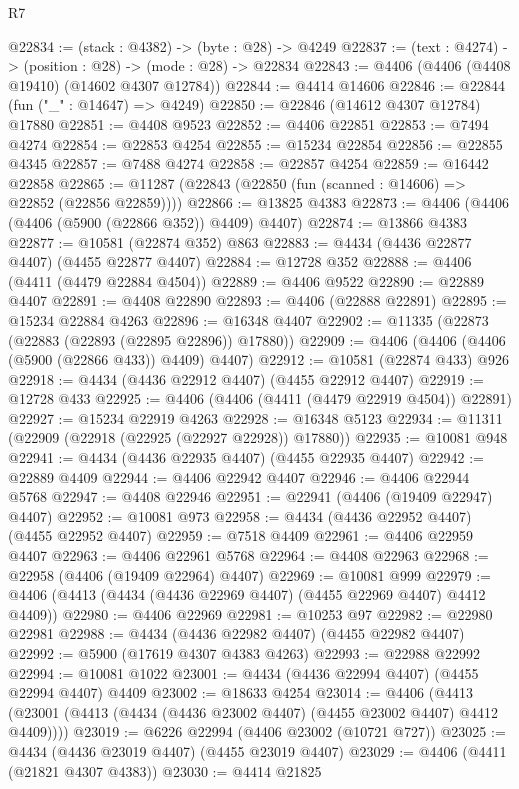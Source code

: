 \begin{lexlean}{R7}
\begin{coremodule}
@22834 := (stack : @4382) -> (byte : @28) -> @4249
@22837 := (text : @4274) -> (position : @28) -> (mode : @28) -> @22834
@22843 := @4406 (@4406 (@4408 @19410) (@14602 @4307 @12784))
@22844 := @4414 @14606
@22846 := @22844 (fun ("_" : @14647) => @4249)
@22850 := @22846 (@14612 @4307 @12784) @17880
@22851 := @4408 @9523
@22852 := @4406 @22851
@22853 := @7494 @4274
@22854 := @22853 @4254
@22855 := @15234 @22854
@22856 := @22855 @4345
@22857 := @7488 @4274
@22858 := @22857 @4254
@22859 := @16442 @22858
@22865 := @11287 (@22843 (@22850 (fun (scanned : @14606) => @22852 (@22856 @22859))))
@22866 := @13825 @4383
@22873 := @4406 (@4406 (@4406 (@5900 (@22866 @352)) @4409) @4407)
@22874 := @13866 @4383
@22877 := @10581 (@22874 @352) @863
@22883 := @4434 (@4436 @22877 @4407) (@4455 @22877 @4407)
@22884 := @12728 @352
@22888 := @4406 (@4411 (@4479 @22884 @4504))
@22889 := @4406 @9522
@22890 := @22889 @4407
@22891 := @4408 @22890
@22893 := @4406 (@22888 @22891)
@22895 := @15234 @22884 @4263
@22896 := @16348 @4407
@22902 := @11335 (@22873 (@22883 (@22893 (@22895 @22896)) @17880))
@22909 := @4406 (@4406 (@4406 (@5900 (@22866 @433)) @4409) @4407)
@22912 := @10581 (@22874 @433) @926
@22918 := @4434 (@4436 @22912 @4407) (@4455 @22912 @4407)
@22919 := @12728 @433
@22925 := @4406 (@4406 (@4411 (@4479 @22919 @4504)) @22891)
@22927 := @15234 @22919 @4263
@22928 := @16348 @5123
@22934 := @11311 (@22909 (@22918 (@22925 (@22927 @22928)) @17880))
@22935 := @10081 @948
@22941 := @4434 (@4436 @22935 @4407) (@4455 @22935 @4407)
@22942 := @22889 @4409
@22944 := @4406 @22942 @4407
@22946 := @4406 @22944 @5768
@22947 := @4408 @22946
@22951 := @22941 (@4406 (@19409 @22947) @4407)
@22952 := @10081 @973
@22958 := @4434 (@4436 @22952 @4407) (@4455 @22952 @4407)
@22959 := @7518 @4409
@22961 := @4406 @22959 @4407
@22963 := @4406 @22961 @5768
@22964 := @4408 @22963
@22968 := @22958 (@4406 (@19409 @22964) @4407)
@22969 := @10081 @999
@22979 := @4406 (@4413 (@4434 (@4436 @22969 @4407) (@4455 @22969 @4407) @4412 @4409))
@22980 := @4406 @22969
@22981 := @10253 @97
@22982 := @22980 @22981
@22988 := @4434 (@4436 @22982 @4407) (@4455 @22982 @4407)
@22992 := @5900 (@17619 @4307 @4383 @4263)
@22993 := @22988 @22992
@22994 := @10081 @1022
@23001 := @4434 (@4436 @22994 @4407) (@4455 @22994 @4407) @4409
@23002 := @18633 @4254
@23014 := @4406
    (@4413 (@23001 (@4413 (@4434 (@4436 @23002 @4407) (@4455 @23002 @4407) @4412 @4409))))
@23019 := @6226 @22994 (@4406 @23002 (@10721 @727))
@23025 := @4434 (@4436 @23019 @4407) (@4455 @23019 @4407)
@23029 := @4406 (@4411 (@21821 @4307 @4383))
@23030 := @4414 @21825

\end{coremodule}
\end{lexlean}

